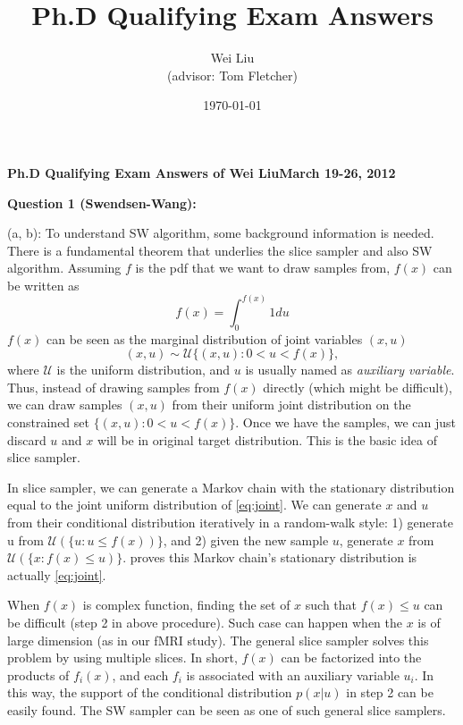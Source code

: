 \documentclass[12pt]{article}
\begin{document}
\title{Ph.D Qualifying Exam Answers} 
\author{Wei Liu\\ \small{(advisor: Tom Fletcher)} }
\date{\today} 
\textbf{Ph.D Qualifying Exam Answers of Wei Liu}\hfill \textbf{March 19-26, 2012}
\hline
\hspace{6 pt}


\textbf{Question 1 (Swendsen-Wang):}

(a, b): To understand SW algorithm, some background information is needed. There
is a fundamental theorem \citep[p47]{robert2004monte} that underlies the slice
sampler and also SW algorithm. Assuming $f$ is the pdf that we want to draw
samples from, $f(x)$ can be written as
\begin{equation*}
  f(x) = \int_0^{f(x)} 1 du
\end{equation*}
$f(x)$ can be seen as the marginal distribution of joint variables $(x, u)$
\begin{equation}
(x, u) \sim \mathcal{U}\{(x,u): 0 < u < f(x)\} \label{eq:joint},
\end{equation}
where $\mathcal{U}$ is the uniform distribution, and $u$ is usually named as
\emph{auxiliary variable}. Thus, instead of  drawing samples from $f(x)$ directly
(which might be difficult), we can draw samples $(x,u)$ from their uniform joint
distribution on the constrained set $\{(x,u): 0 < u < f(x)\}$. Once we have the
samples, we can just discard $u$ and $x$ will be in original target
distribution. This is the basic idea of slice sampler.

In slice sampler, we can generate a Markov chain with the stationary
distribution equal to the joint uniform distribution of \eqref{eq:joint}. We can
generate $x$ and $u$ from their conditional distribution iteratively in a
random-walk style: 1) generate u from $\mathcal{U}(\{u:u \leq f(x))\}$, and 2)
given the new sample $u$, generate $x$ from $\mathcal{U}(\{x: f(x) \leq
u)\}$. \citet[p323]{robert2004monte} proves this Markov chain's stationary
distribution is actually \eqref{eq:joint}.

When $f(x)$ is complex function, finding the set of $x$ such that $f(x) \leq u$
can be difficult (step 2 in above procedure). Such case can happen when the $x$
is of large dimension (as in our fMRI study). The general slice sampler solves
this problem by using multiple slices. In short, $f(x)$ can be factorized into
the products of $f_i(x)$, and each $f_i$ is associated with an auxiliary
variable $u_i$. In this way, the support of the conditional distribution
$p(x|u)$ in step 2 can be easily found. The SW sampler can be seen as one of
such general slice samplers.
\end{document}

